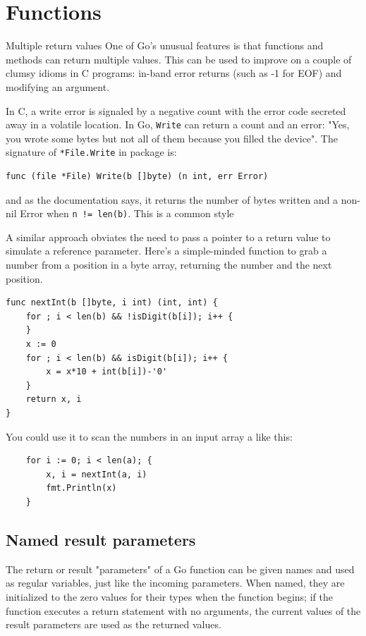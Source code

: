 \section{Functions}
\label{sec:functions}
Multiple return values
One of Go's unusual features is that functions and methods can return multiple
values. This can be used to improve on a couple of clumsy idioms in C programs:
in-band error returns (such as -1 for EOF) and modifying an argument.

In C, a write error is signaled by a negative count with the error code
secreted away in a volatile location. In Go, \lstinline{Write} can return a count and an
error: "Yes, you wrote some bytes but not all of them because you filled the
device". The signature of \lstinline{*File.Write} in package
 is:
\begin{lstlisting}
func (file *File) Write(b []byte) (n int, err Error)
\end{lstlisting}
and as the documentation says, it returns the number of bytes written and a
non-nil Error when \lstinline{n != len(b)}. This is a common style

A similar approach obviates the need to pass a pointer to a return value to
simulate a reference parameter. Here's a simple-minded function to grab a
number from a position in a byte array, returning the number and the next
position.
\begin{lstlisting}
func nextInt(b []byte, i int) (int, int) {
    for ; i < len(b) && !isDigit(b[i]); i++ {
    }
    x := 0
    for ; i < len(b) && isDigit(b[i]); i++ {
        x = x*10 + int(b[i])-'0'
    }
    return x, i
}
\end{lstlisting}
You could use it to scan the numbers in an input array a like this:
\begin{lstlisting}
    for i := 0; i < len(a); {
        x, i = nextInt(a, i)
        fmt.Println(x)
    }
\end{lstlisting}
\subsection{Named result parameters}
The return or result "parameters" of a Go function can be given names and used
as regular variables, just like the incoming parameters. When named, they are
initialized to the zero values for their types when the function begins; if the
function executes a return statement with no arguments, the current values of
the result parameters are used as the returned values.

